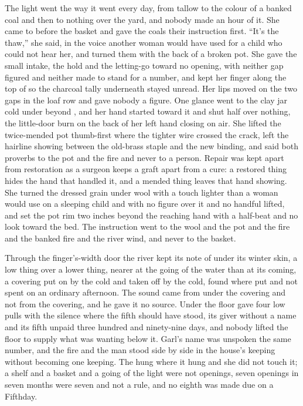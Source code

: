 The light went the way it went every day, from tallow to the colour of a banked coal and then to nothing over the yard, and nobody made an hour of it. She came to  before the basket and gave the coals their instruction first. “It's the thaw,” she said, in the voice another woman would have used for a child who could not hear her, and turned them with the back of a broken pot. She gave the small intake, the hold and the letting-go toward no opening, with neither gap figured and neither made to stand for a number, and kept her finger along the top of  so the charcoal tally underneath stayed unread. Her lips moved on the two gaps in the loaf row and gave nobody a figure. One glance went to the clay jar cold under  beyond , and her hand started toward it and shut half over nothing, the little-door burn on the back of her left hand closing on air. She lifted the twice-mended pot thumb-first where the tighter wire crossed the crack, left the hairline showing between the old-brass staple and the new binding, and said both proverbs to the pot and the fire and never to a person. Repair was kept apart from restoration as a surgeon keeps a graft apart from a cure: a restored thing hides the hand that handled it, and a mended thing leaves that hand showing. She turned the dressed grain under wool with a touch lighter than a woman would use on a sleeping child and with no figure over it and no handful lifted, and set the pot rim two inches beyond the reaching hand with a half-beat and no look toward the bed. The instruction went to the wool and the pot and the fire and the banked fire and the river wind, and never to the basket.

Through the finger's-width door the river kept its note of  under its winter skin, a low thing over a lower thing, nearer at the going of the water than at its coming, a covering put on by the cold and taken off by the cold, found where put and not spent on an ordinary afternoon. The sound came from under the covering and not from the covering, and he gave it no source. Under the floor  gave four low pulls with the silence where the fifth should have stood, its giver without a name and its fifth unpaid three hundred and ninety-nine days, and nobody lifted the floor to supply what was wanting below it. Garl's name was unspoken the same number, and the fire and the man stood side by side in the house's keeping without becoming one keeping. The  hung where it hung and she did not touch it; a shelf and a basket and a going of the light were not openings, seven openings in seven months were seven and not a rule, and no eighth was made due on a Fifthday.

